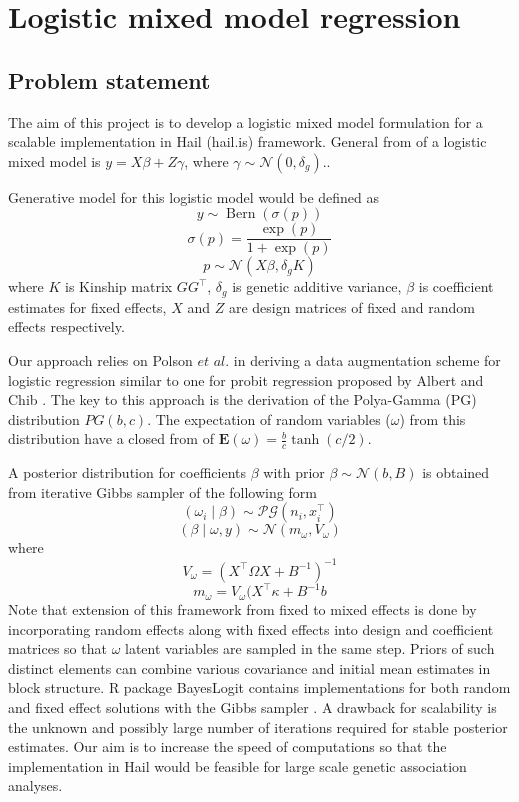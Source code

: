 \documentclass [12pt,a4paper]{report}
\begin{document}
\section*{Logistic mixed model regression}
\subsection*{Problem statement}
The aim of this project is to develop a logistic mixed model formulation for a scalable implementation in Hail (hail.is) framework.
General from of a logistic mixed model is   \( y=X\beta + Z\gamma \), where \(\gamma \sim \mathcal{N}(0,\delta_g).\).\par 
Generative model for this logistic model would be defined as \[ y \sim \operatorname{Bern} (\sigma(p)) \]  \[\sigma(p)=\frac{\exp(p)}{1+\exp(p)} \] \[p \sim \mathcal{N}(X\beta, \delta_g K) \]  where $K$ is Kinship matrix $GG^{\intercal}$, $\delta_g$ is genetic additive variance, $\beta$ is coefficient estimates for fixed effects, $X$ and $Z$ are design matrices of fixed and random effects respectively.\par
Our approach relies on Polson $\textit{et al.}$ \cite{polson_bayesian_2012} in deriving a data augmentation scheme for logistic regression similar to one for probit regression proposed by Albert and Chib \cite{albert_bayesian_1993}. The key to this approach is the derivation of the Polya-Gamma (PG) distribution $PG(b,c)$. The expectation of random variables ($\omega$) from this distribution have a closed from of \(\mathbf{E}(\omega)=\frac{b}{c}\tanh(c/2)\). \par 
A posterior distribution for coefficients $\beta$ with prior   \(\beta \sim \mathcal{N}(b,B) \) is obtained from iterative Gibbs sampler of the following form \[(\omega_i \mid \beta ) \sim  \mathcal{PG}(n_i,x^{\intercal}_i)  \]    \[(\beta \mid \omega,y ) \sim  \mathcal{N}(m_\omega,V_\omega)  \] where    \[ V_\omega = (X^{\intercal} \Omega X + B^{-1})^{-1}  \]   \[ m_\omega = V_\omega(X^{\intercal}\kappa +  B^{-1}b \] 
Note that extension of this framework from fixed to mixed effects  is done by incorporating random effects along with fixed effects into design and coefficient matrices so that $\omega$ latent variables are sampled in the same step. Priors of such distinct elements can combine various covariance and initial mean estimates in block structure. R package  BayesLogit contains implementations for both random and fixed effect solutions with the Gibbs sampler \cite{polson_bayesian_2012}. A drawback for scalability is the unknown and possibly large number of iterations required for stable posterior estimates. Our aim is to increase the speed of computations so that the implementation in Hail would be feasible for large scale genetic association analyses. 
\end{document}
